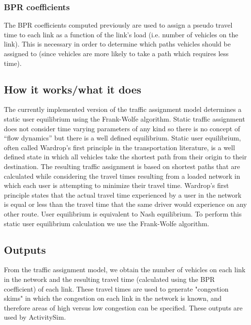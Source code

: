 \subsubsection{BPR coefficients}
The BPR coefficients computed previously are used to assign a pseudo travel time to each link as a function of the link's load (i.e. number of vehicles on the link). This is necessary in order to determine which paths vehicles should be assigned to (since vehicles are more likely to take a path which requires less time).


\subsection{How it works/what it does}
The currently implemented version of the traffic assignment model determines a static user equilibrium using the Frank-Wolfe algorithm. Static traffic assignment does not consider time varying parameters of any kind so there is no concept of \enquote{flow dynamics} but there is a well defined equilibrium. Static user equilibrium, often called Wardrop’s first principle in the transportation literature, is a well defined state in which all vehicles take the shortest path from their origin to their destination. The resulting traffic assignment is based on shortest paths that are calculated while considering the travel times resulting from a loaded network in which each user is attempting to minimize their travel time. 
Wardrop's first principle states that the actual travel time experienced by a user in the network is equal or less than the travel time that the same driver would experience on any other route. User equilibrium is equivalent to Nash equilibrium.
 To perform this static user equilibrium calculation we use the Frank-Wolfe algorithm. 


\subsection{Outputs}
From the traffic assignment model, we obtain the number of vehicles on each link in the network and the resulting travel time (calculated using the BPR coefficient) of each link. These travel times are used to generate "congestion skims" in which the congestion on each link in the network is known, and therefore areas of high versus low congestion can be specified. These outputs are used by ActivitySim.  


